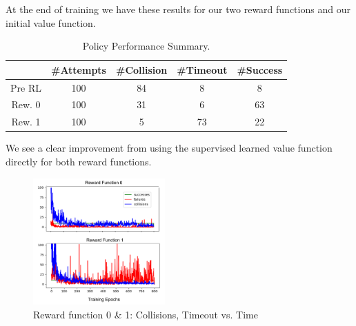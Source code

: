 \documentclass[conference]{IEEEtran}
\begin{document}
At the end of training we have these results for our two reward functions and our initial value function. 
\begin{table}[h!]
\begin{center}
\caption{Policy Performance Summary.}
\begin{tabular}{||c c c c c||} 
 \hline
  & \#Attempts & \#Collision  & \#Timeout  & \#Success \\ [0.5ex] 
 \hline\hline
 Pre RL & 100 & 84 & 8  & 8 \\ 
 \hline
 Rew. 0 & 100 & 31 & 6  & 63 \\
 Rew. 1 & 100 & 5 & 73  & 22 \\
 \hline
\end{tabular}
\end{center}
\end{table}

\noindent We see a clear improvement from using the supervised learned value function directly for both reward functions. 

\begin{figure}[h!]
    \centering
    \includegraphics[width=0.45\textwidth]{docs/latex/figures/rwd_combo.png}
    \caption{Reward function 0 \& 1: Collisions, Timeout vs. Time}
    \label{fig:rew_0_coll}
\end{figure}
\end{document}
